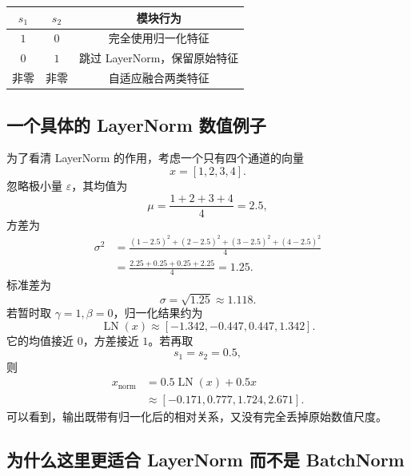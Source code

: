 \documentclass[UTF8,12pt,a4paper,fontset=none]{ctexart}
\newcommand{\LN}{\operatorname{LN}}
\begin{document}
\begin{center}
\begin{tabular}{ccc}
\toprule
$s_1$ & $s_2$ & 模块行为\\
\midrule
$1$ & $0$ & 完全使用归一化特征\\
$0$ & $1$ & 跳过 LayerNorm，保留原始特征\\
非零 & 非零 & 自适应融合两类特征\\
\bottomrule
\end{tabular}
\end{center}



\subsection{一个具体的 LayerNorm 数值例子}

为了看清 LayerNorm 的作用，考虑一个只有四个通道的向量
\begin{equation}
 x=[1,2,3,4].
\end{equation}
忽略极小量 $\varepsilon$，其均值为
\begin{equation}
 \mu=\frac{1+2+3+4}{4}=2.5,
\end{equation}
方差为
\begin{align}
 \sigma^2
 &=\frac{(1-2.5)^2+(2-2.5)^2+(3-2.5)^2+(4-2.5)^2}{4}\\
 &=\frac{2.25+0.25+0.25+2.25}{4}=1.25.
\end{align}
标准差为
\begin{equation}
 \sigma=\sqrt{1.25}\approx1.118.
\end{equation}
若暂时取 $\gamma=1,\beta=0$，归一化结果约为
\begin{equation}
 \LN(x)\approx[-1.342,-0.447,0.447,1.342].
\end{equation}
它的均值接近 $0$，方差接近 $1$。若再取
\begin{equation}
 s_1=s_2=0.5,
\end{equation}
则
\begin{align}
 x_{\mathrm{norm}}
 &=0.5\LN(x)+0.5x\\
 &\approx[-0.171,0.777,1.724,2.671].
\end{align}
可以看到，输出既带有归一化后的相对关系，又没有完全丢掉原始数值尺度。

\subsection{为什么这里更适合 LayerNorm 而不是 BatchNorm}
\end{document}
